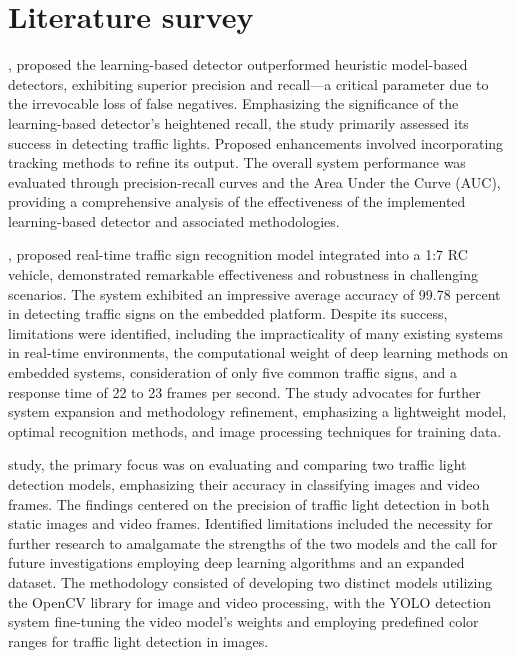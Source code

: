 \documentclass[12 pt]{report}
\begin{document}
\section{Literature survey}
\justify
 {
  \hspace*{1cm}{\bfseries Mark P Philipsen}, proposed the learning-based detector outperformed heuristic model-based detectors, exhibiting superior precision and recall—a critical parameter due to the irrevocable loss of false negatives. Emphasizing the significance of the learning-based detector’s heightened recall, the study primarily assessed its success in detecting traffic lights. Proposed enhancements involved incorporating tracking methods to refine its output. The overall system performance was evaluated through precision-recall curves and the Area Under the Curve (AUC), providing a comprehensive analysis of the effectiveness of the implemented learning-based detector and associated methodologies.

  \hspace*{1cm}{\bfseries Trung-Hieu Nguyen’s}, proposed real-time traffic sign recognition model integrated into a 1:7 RC vehicle, demonstrated remarkable effectiveness and robustness in challenging scenarios. The system exhibited an impressive average accuracy of 99.78 percent in detecting traffic signs on the embedded platform. Despite its success, limitations were identified, including the impracticality of many existing systems in real-time environments, the computational weight of deep learning methods on embedded systems, consideration of only five common traffic signs, and a response time of 22 to 23 frames per second. The study advocates for further system expansion and methodology refinement, emphasizing a lightweight model, optimal recognition methods, and image processing techniques for training data.

  \hspace*{1cm}{\bfseries Noor Hussain Sarhan’s} study, the primary focus was on evaluating and comparing two traffic light detection models, emphasizing their accuracy in classifying images and video frames. The findings centered on the precision of traffic light detection in both static images and video frames. Identified limitations included the necessity for further research to amalgamate the strengths of the two models and the call for future investigations employing deep learning algorithms and an expanded dataset. The methodology consisted of developing two distinct models utilizing the OpenCV library for image and video processing, with the YOLO detection system fine-tuning the video model’s weights and employing predefined color ranges for traffic light detection in images.

}
\end{document}
